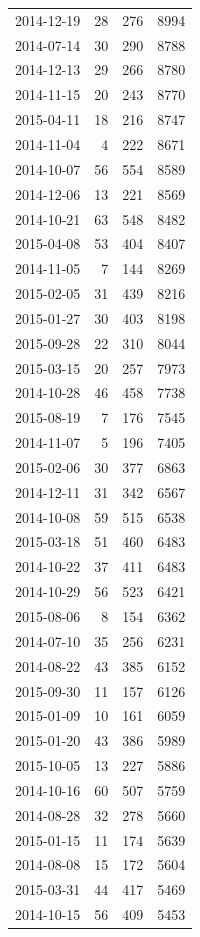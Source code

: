 \begin{tabular}{lrrr}
2014-12-19 & 28 & 276 & 8994 \\
2014-07-14 & 30 & 290 & 8788 \\
2014-12-13 & 29 & 266 & 8780 \\
2014-11-15 & 20 & 243 & 8770 \\
2015-04-11 & 18 & 216 & 8747 \\
2014-11-04 & 4 & 222 & 8671 \\
2014-10-07 & 56 & 554 & 8589 \\
2014-12-06 & 13 & 221 & 8569 \\
2014-10-21 & 63 & 548 & 8482 \\
2015-04-08 & 53 & 404 & 8407 \\
2014-11-05 & 7 & 144 & 8269 \\
2015-02-05 & 31 & 439 & 8216 \\
2015-01-27 & 30 & 403 & 8198 \\
2015-09-28 & 22 & 310 & 8044 \\
2015-03-15 & 20 & 257 & 7973 \\
2014-10-28 & 46 & 458 & 7738 \\
2015-08-19 & 7 & 176 & 7545 \\
2014-11-07 & 5 & 196 & 7405 \\
2015-02-06 & 30 & 377 & 6863 \\
2014-12-11 & 31 & 342 & 6567 \\
2014-10-08 & 59 & 515 & 6538 \\
2015-03-18 & 51 & 460 & 6483 \\
2014-10-22 & 37 & 411 & 6483 \\
2014-10-29 & 56 & 523 & 6421 \\
2015-08-06 & 8 & 154 & 6362 \\
2014-07-10 & 35 & 256 & 6231 \\
2014-08-22 & 43 & 385 & 6152 \\
2015-09-30 & 11 & 157 & 6126 \\
2015-01-09 & 10 & 161 & 6059 \\
2015-01-20 & 43 & 386 & 5989 \\
2015-10-05 & 13 & 227 & 5886 \\
2014-10-16 & 60 & 507 & 5759 \\
2014-08-28 & 32 & 278 & 5660 \\
2015-01-15 & 11 & 174 & 5639 \\
2014-08-08 & 15 & 172 & 5604 \\
2015-03-31 & 44 & 417 & 5469 \\
2014-10-15 & 56 & 409 & 5453 \\

\end{tabular}
